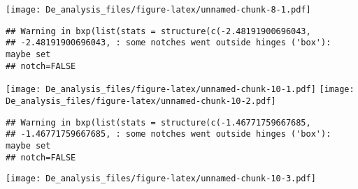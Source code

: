\documentclass[]{article}
\begin{document}
\texttt{[image: De\_analysis\_files/figure-latex/unnamed-chunk-8-1.pdf]}

\begin{verbatim}
## Warning in bxp(list(stats = structure(c(-2.48191900696043,
## -2.48191900696043, : some notches went outside hinges ('box'): maybe set
## notch=FALSE
\end{verbatim}

\texttt{[image: De\_analysis\_files/figure-latex/unnamed-chunk-10-1.pdf]}
\texttt{[image: De\_analysis\_files/figure-latex/unnamed-chunk-10-2.pdf]}

\begin{verbatim}
## Warning in bxp(list(stats = structure(c(-1.46771759667685,
## -1.46771759667685, : some notches went outside hinges ('box'): maybe set
## notch=FALSE
\end{verbatim}

\texttt{[image: De\_analysis\_files/figure-latex/unnamed-chunk-10-3.pdf]}
\end{document}
